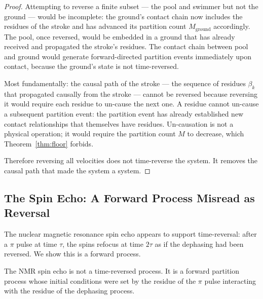 \begin{proof}
Attempting to reverse a finite subset --- the pool and swimmer but not the
ground --- would be incomplete: the ground's contact chain now includes the
residues of the stroke and has advanced its partition count $M_{\mathrm{ground}}$
accordingly. The pool, once reversed, would be embedded in a ground that has
already received and propagated the stroke's residues. The contact chain between
pool and ground would generate forward-directed partition events immediately upon
contact, because the ground's state is not time-reversed.

Most fundamentally: the causal path of the stroke --- the sequence of residues
$\beta_k$ that propagated causally from the stroke --- cannot be reversed because
reversing it would require each residue to un-cause the next one. A residue
cannot un-cause a subsequent partition event: the partition event has already
established new contact relationships that themselves have residues. Un-causation
is not a physical operation; it would require the partition count $M$ to
decrease, which Theorem~\ref{thm:floor} forbids.

Therefore reversing all velocities does not time-reverse the system. It removes
the causal path that made the system a system.
\end{proof}

\subsection{The Spin Echo: A Forward Process Misread as Reversal}
\label{subsec:spin_echo}

The nuclear magnetic resonance spin echo appears to support time-reversal: after
a $\pi$ pulse at time $\tau$, the spins refocus at time $2\tau$ as if the
dephasing had been reversed. We show this is a forward process.

\begin{theorem}
\label{thm:spin_echo}
The NMR spin echo is not a time-reversed process. It is a forward partition
process whose initial conditions were set by the residue of the $\pi$ pulse
interacting with the residue of the dephasing process.
\end{theorem}

